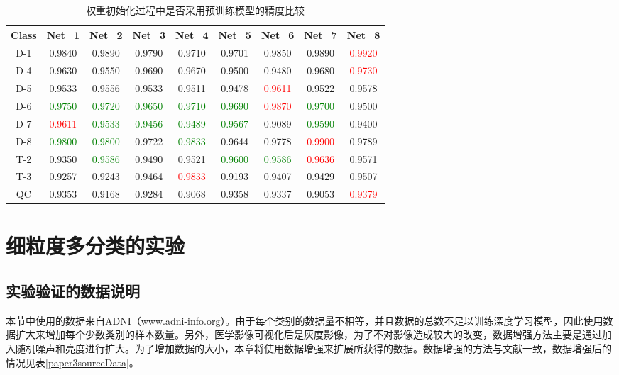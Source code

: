 \begin{table}[ht]
 \centering
\caption{权重初始化过程中是否采用预训练模型的精度比较}
\begin{tabular}{ccccccccc}
\toprule
Class   &  Net\_1 &  Net\_2   &  Net\_3 &Net\_4   & Net\_5  & Net\_6  &  Net\_7   &\textbf{Net\_8}    \\ \midrule
D-1 & 0.9840 & 0.9890 & 0.9790  & 0.9710 & 0.9701 & 0.9850 & 0.9890 &\textcolor{red}{{0.9920}}  \\
D-4 & 0.9630 & 0.9550 & 0.9690 & 0.9670  & 0.9500 & 0.9480 & 0.9680 &\textcolor{red}{{0.9730}}  \\
D-5 & 0.9533 & 0.9556 & 0.9533 & 0.9511 & 0.9478 & \textcolor{red}{{0.9611}} & 0.9522 & 0.9578    \\
D-6  & \textcolor{green}{{0.9750}}           & \textcolor{green}{{0.9720}}
& \textcolor{green}{{0.9650}}
& \textcolor{green}{{0.9710}}
& \textcolor{green}{{0.9690}}
& \textcolor{red}{{0.9870}}
& \textcolor{green}{{0.9700}}
& 0.9500    \\
D-7 & \textcolor{red}{{0.9611}}
& \textcolor{green}{{0.9533}}
& \textcolor{green}{{0.9456}}
& \textcolor{green}{{0.9489}}
& \textcolor{green}{{0.9567}}
& 0.9089
& \textcolor{green}{{0.9590}}
& 0.9400    \\
D-8
& \textcolor{green}{{0.9800}}
& \textcolor{green}{{0.9800}}
& 0.9722
& \textcolor{green}{{0.9833}}
& 0.9644
& 0.9778
& \textcolor{red}{{0.9900}}
& 0.9789\\
T-2
& 0.9350
& \textcolor{green}{{0.9586}}
& 0.9490
& 0.9521
& \textcolor{green}{{0.9600}}
& \textcolor{green}{{0.9586}}
& \textcolor{red}{{0.9636}}
& 0.9571\\
T-3
& 0.9257
& 0.9243
& 0.9464
& \textcolor{red}{{0.9833}}
& 0.9193
& 0.9407
& 0.9429
& 0.9507
\\
QC
& 0.9353
& 0.9168
& 0.9284
& 0.9068
& 0.9358
& 0.9337
& 0.9053
& \textcolor{red}{{0.9379}}
\\ \bottomrule
\end{tabular}
\label{paper3withPretrained}
\end{table}


\section{细粒度多分类的实验}\label{chapter4.4}
\subsection{实验验证的数据说明}
本节中使用的数据来自ADNI（www.adni-info.org）。由于每个类别的数据量不相等，并且数据的总数不足以训练深度学习模型，因此使用数据扩大来增加每个少数类别的样本数量。另外，医学影像可视化后是灰度影像，为了不对影像造成较大的改变，数据增强方法主要是通过加入随机噪声和亮度进行扩大。为了增加数据的大小，本章将使用数据增强来扩展所获得的数据。数据增强的方法与文献\cite{Fangmeie2022}一致，数据增强后的情况见表\ref{paper3sourceData}。

